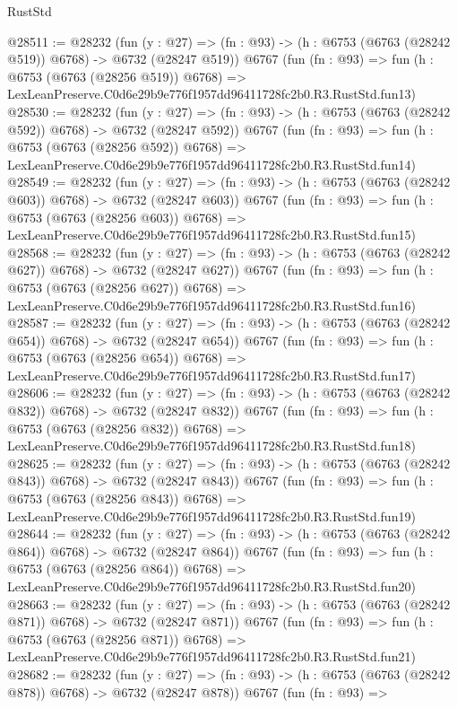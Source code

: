 \begin{lexlean}{RustStd}
\begin{coremodule}
@28511 := @28232
    (fun (y : @27) => (fn : @93) -> (h : @6753 (@6763 (@28242 @519)) @6768) -> @6732 (@28247 @519))
    @6767
    (fun (fn : @93) =>
    fun (h : @6753 (@6763 (@28256 @519)) @6768) =>
    LexLeanPreserve.C0d6e29b9e776f1957dd96411728fc2b0.R3.RustStd.fun13)
@28530 := @28232
    (fun (y : @27) => (fn : @93) -> (h : @6753 (@6763 (@28242 @592)) @6768) -> @6732 (@28247 @592))
    @6767
    (fun (fn : @93) =>
    fun (h : @6753 (@6763 (@28256 @592)) @6768) =>
    LexLeanPreserve.C0d6e29b9e776f1957dd96411728fc2b0.R3.RustStd.fun14)
@28549 := @28232
    (fun (y : @27) => (fn : @93) -> (h : @6753 (@6763 (@28242 @603)) @6768) -> @6732 (@28247 @603))
    @6767
    (fun (fn : @93) =>
    fun (h : @6753 (@6763 (@28256 @603)) @6768) =>
    LexLeanPreserve.C0d6e29b9e776f1957dd96411728fc2b0.R3.RustStd.fun15)
@28568 := @28232
    (fun (y : @27) => (fn : @93) -> (h : @6753 (@6763 (@28242 @627)) @6768) -> @6732 (@28247 @627))
    @6767
    (fun (fn : @93) =>
    fun (h : @6753 (@6763 (@28256 @627)) @6768) =>
    LexLeanPreserve.C0d6e29b9e776f1957dd96411728fc2b0.R3.RustStd.fun16)
@28587 := @28232
    (fun (y : @27) => (fn : @93) -> (h : @6753 (@6763 (@28242 @654)) @6768) -> @6732 (@28247 @654))
    @6767
    (fun (fn : @93) =>
    fun (h : @6753 (@6763 (@28256 @654)) @6768) =>
    LexLeanPreserve.C0d6e29b9e776f1957dd96411728fc2b0.R3.RustStd.fun17)
@28606 := @28232
    (fun (y : @27) => (fn : @93) -> (h : @6753 (@6763 (@28242 @832)) @6768) -> @6732 (@28247 @832))
    @6767
    (fun (fn : @93) =>
    fun (h : @6753 (@6763 (@28256 @832)) @6768) =>
    LexLeanPreserve.C0d6e29b9e776f1957dd96411728fc2b0.R3.RustStd.fun18)
@28625 := @28232
    (fun (y : @27) => (fn : @93) -> (h : @6753 (@6763 (@28242 @843)) @6768) -> @6732 (@28247 @843))
    @6767
    (fun (fn : @93) =>
    fun (h : @6753 (@6763 (@28256 @843)) @6768) =>
    LexLeanPreserve.C0d6e29b9e776f1957dd96411728fc2b0.R3.RustStd.fun19)
@28644 := @28232
    (fun (y : @27) => (fn : @93) -> (h : @6753 (@6763 (@28242 @864)) @6768) -> @6732 (@28247 @864))
    @6767
    (fun (fn : @93) =>
    fun (h : @6753 (@6763 (@28256 @864)) @6768) =>
    LexLeanPreserve.C0d6e29b9e776f1957dd96411728fc2b0.R3.RustStd.fun20)
@28663 := @28232
    (fun (y : @27) => (fn : @93) -> (h : @6753 (@6763 (@28242 @871)) @6768) -> @6732 (@28247 @871))
    @6767
    (fun (fn : @93) =>
    fun (h : @6753 (@6763 (@28256 @871)) @6768) =>
    LexLeanPreserve.C0d6e29b9e776f1957dd96411728fc2b0.R3.RustStd.fun21)
@28682 := @28232
    (fun (y : @27) => (fn : @93) -> (h : @6753 (@6763 (@28242 @878)) @6768) -> @6732 (@28247 @878))
    @6767
    (fun (fn : @93) =>

\end{coremodule}
\end{lexlean}

